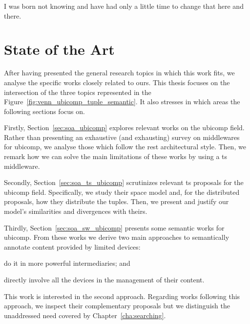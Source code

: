 
\begin{savequote}[50mm]
I was born not knowing and have had only a little time to change that here and there.
\end{savequote}


\chapter{State of the Art}
\label{cha:stateoftheart}

\ifpdf
    \graphicspath{{\pathchapthree/figures/PNG/}{\pathchapthree/figures/PDF/}{\pathchapthree/figures/}}
\else
    \graphicspath{{\pathchapthree/figures/EPS/}{\pathchapthree/figures/}}
\fi



After having presented the general research topics in which this work fits, we analyse the specific works closely related to ours.
This thesis focuses on the intersection of the three topics represented in the Figure~\ref{fig:venn_ubicomp_tuple_semantic}. %
It also stresses in which areas the following sections focus on.


Firstly, Section~\ref{sec:soa_ubicomp} explores relevant works on the \ac{ubicomp} field.
Rather than presenting an exhaustive (and exhausting) survey on middlewares for \ac{ubicomp},
we analyse those which follow the \ac{rest} architectural style.
Then, we remark how we can solve the main limitations of these works by using a \ac{ts} middleware.


Secondly, Section~\ref{sec:soa_ts_ubicomp} scrutinizes relevant \ac{ts} proposals for the \ac{ubicomp} field.
Specifically, we study their space model and, for the distributed proposals, how they distribute the tuples.
Then, we present and justify our model's similarities and divergences with theirs.


Thirdly, Section~\ref{sec:soa_sw_ubicomp} presents some semantic works for \ac{ubicomp}.
From these works we derive two main approaches to semantically annotate content provided by limited devices:
\begin{enumerate*}[label=\itshape\alph*\upshape)]
  \item do it in more powerful intermediaries; and
  \item directly involve all the devices in the management of their content.
\end{enumerate*}
This work is interested in the second approach.
Regarding works following this approach, we inspect their complementary proposals but we distinguish the unaddressed need covered by Chapter~\ref{cha:searching}. %


